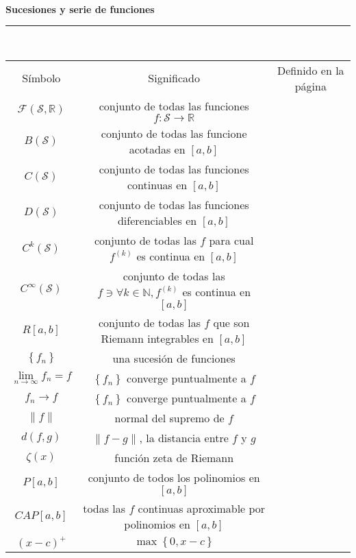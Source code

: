 \documentclass[a4,paper]{article}
\newcommand{\centrado}[1]{
	\ \\[.1\baselineskip]
	{\Large\bfseries\centering #1\par}
	\hrule
	\ \\[.1\baselineskip]
}
\begin{document}
\centrado{Sucesiones y serie de funciones}
\begin{tabular}{ccc}
	Símbolo & Significado & Definido en la página \\
	$\mathcal{F}\left(\mathcal{S},\mathbb{R}\right)$ & conjunto de todas las funciones $f\colon\mathcal{S}\rightarrow\mathbb{R}$ & \\
	$B\left(\mathcal{S}\right)$ & conjunto de todas las funcione acotadas en $\left[a,b\right]$ & \\
	$C\left(\mathcal{S}\right)$ & conjunto de todas las funciones continuas en $\left[a,b\right]$ & \\
	$D\left(\mathcal{S}\right)$ & conjunto de todas las funciones diferenciables en $\left[a,b\right]$ & \\
	$C^{k}\left(\mathcal{S}\right)$ & conjunto de todas las $f$ para cual $f^{(k)}$ es continua en $\left[a,b\right]$ & \\
	$C^{\infty}\left(\mathcal{S}\right)$ & conjunto de todas las $f\ni\forall k\in\mathbb{N},f^{(k)}$ es continua en $\left[a,b\right]$ & \\
	$R\left[a,b\right]$ & conjunto de todas las $f$ que son Riemann integrables en $\left[a,b\right]$ & \\
	$\left\{f_{n}\right\}$ & una sucesión de funciones & \\
	$\lim\limits_{n\to\infty}f_{n}=f$ & $\left\{f_{n}\right\}$ converge puntualmente a $f$ & \\
	$f_{n}\rightarrow f$ & $\left\{f_{n}\right\}$ converge puntualmente a $f$ & \\
	$\|f\|$ & normal del supremo de $f$ & \\
	$d\left(f,g\right)$ & $\|f-g\|$, la distancia entre $f$ y $g$ & \\
	$\zeta(x)$ & función zeta de Riemann & \\
	$P\left[a,b\right]$ & conjunto de todos los polinomios en $\left[a,b\right]$ & \\
	$CAP\left[a,b\right]$ & todas las $f$ continuas aproximable por polinomios en $\left[a,b\right]$ & \\
	${\left(x-c\right)}^{+}$ & $\max\left\{0,x-c\right\}$ & \\
\end{tabular}
\end{document}
